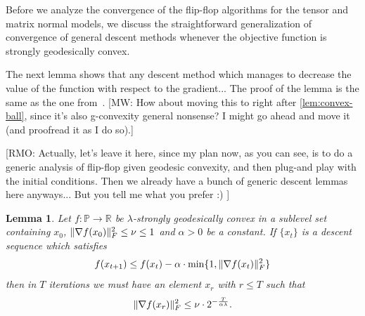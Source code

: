 \documentclass[aos]{imsart}
\newtheorem{lemma}[theorem]{Lemma}
\theoremstyle{definition}
\numberwithin{equation}{section}
\DeclarePairedDelimiter{\norm}{\lVert}{\rVert}
\newcommand{\R}{{\mathbb{R}}}
\newcommand{\SPD}{\mathbb{P}}
\newcommand{\RMO}[1]{{\color{red}[RMO: #1]}}
\newcommand{\MW}[1]{{\color{red}[MW: #1]}}
\begin{document}
Before we analyze the convergence of the flip-flop algorithms for the tensor and matrix normal models, we discuss the straightforward generalization of convergence of general descent methods whenever the objective function is strongly geodesically convex.

The next lemma shows that any descent method which manages to decrease the value of the function with respect to the gradient...
The proof of the lemma is the same as the one from~\cite[Lemma 4.8]{FM20}.
\MW{How about moving this to right after \cref{lem:convex-ball}, since it's also g-convexity general nonsense? I might go ahead and move it (and proofread it as I do so).}

\RMO{Actually, let's leave it here, since my plan now, as you can see, is to do a generic analysis of flip-flop given geodesic convexity, and then plug-and play with the initial conditions. Then we already have a bunch of generic descent lemmas here anyways... But you tell me what you prefer :)  }

\begin{lemma}\label{lem:descent-sublevel-set}
	Let $f : \SPD \rightarrow \R$ be $\lambda$-strongly geodesically convex in a sublevel set containing $x_0$, $\norm{\nabla f(x_0)}_F^2 \leq \nu \leq 1$ and $\alpha > 0$ be a constant.
	If $\{x_t\}$ is a descent sequence which satisfies
	$$ f(x_{t+1}) \leq f(x_t) - \alpha \cdot \min\{1,  \norm{\nabla f(x_t)}^2_F \} $$
	then in $T$ iterations we must have an element $x_r$ with $r \leq T$ such that
	$$ \norm{\nabla f(x_r)}^2_F \leq \nu \cdot 2^{- \frac{T}{\alpha \lambda}}.   $$
\end{lemma}
\end{document}
